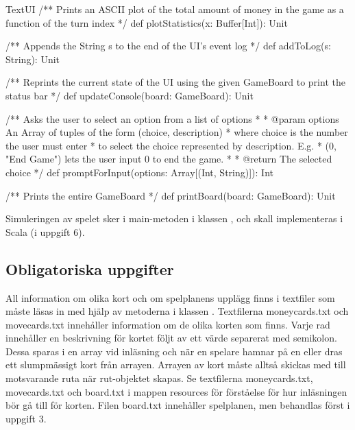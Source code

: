 \begin{ScalaSpec}{TextUI}
   /** Prints an ASCII plot of the total amount
       of money in the game as a function of the turn index */
  def plotStatistics(x: Buffer[Int]): Unit

  /** Appends the String s to the end of the UI's event log */
  def addToLog(s: String): Unit 

  /** Reprints the current state of the UI using the given
      GameBoard to print the status bar */
  def updateConsole(board: GameBoard): Unit 
 
  /** Asks the user to select an option from a list of options
   *
   * @param options An Array of tuples of the form (choice, description)
   *                where choice is the number the user must enter
   *                to select the choice represented by description. E.g.
   *                (0, "End Game") lets the user input 0 to end the game.
   *
   * @return The selected choice
   */
  def promptForInput(options: Array[(Int, String)]): Int 

  /** Prints the entire GameBoard */
  def printBoard(board: GameBoard): Unit 
\end{ScalaSpec}

Simuleringen av spelet sker i main-metoden i klassen , och skall implementeras i Scala (i uppgift 6).


\subsection{Obligatoriska uppgifter}

\Task All information om olika kort och om spelplanens upplägg finns i textfiler som måste läsas in med hjälp av metoderna i klassen .
Textfilerna moneycards.txt och movecards.txt innehåller information om de olika korten som finns.
Varje rad innehåller en beskrivning för kortet följt av ett värde separerat med semikolon. Dessa sparas i en array vid inläsning och när en spelare hamnar på en  eller  dras ett slumpmässigt kort från arrayen. 
Arrayen av kort måste alltså skickas med till motsvarande ruta när rut-objektet skapas.
Se textfilerna moneycards.txt, movecards.txt och board.txt i mappen resources för förståelse för hur inläsningen bör gå till för korten.
Filen board.txt innehåller spelplanen, men behandlas först i uppgift 3.



